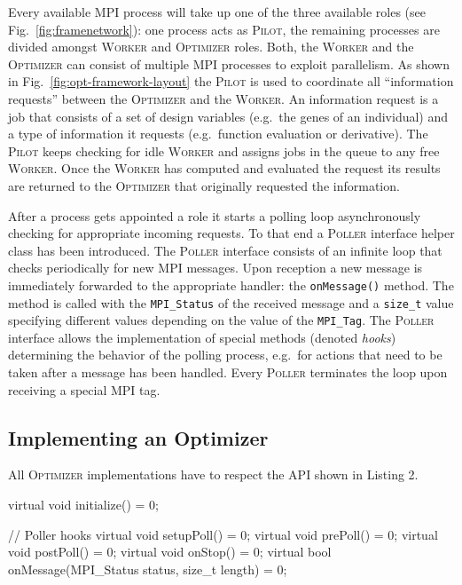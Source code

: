 \documentclass[preprint,linenumbers,amsmath,amssymb,aps,prstab]{revtex4-1}%
\begin{document}
Every available MPI process will take up one of the three available roles (see
  Fig.~\ref{fig:framenetwork}):  one process acts as \textsc{Pilot}, the
  remaining processes are divided amongst \textsc{Worker} and
  \textsc{Optimizer} roles.
Both, the \textsc{Worker} and the \textsc{Optimizer} can consist of multiple
  MPI processes to exploit parallelism.
As shown in Fig.~\ref{fig:opt-framework-layout} the \textsc{Pilot} is used
  to coordinate all ``information requests'' between the \textsc{Optimizer}
  and the \textsc{Worker}.
An information request is a job that consists of a set of design variables
  (e.g.~the genes of an individual) and a type of information it requests
  (e.g.~function evaluation or derivative).
The \textsc{Pilot} keeps checking for idle \textsc{Worker} and assigns jobs
  in the queue to any free \textsc{Worker}.
Once the \textsc{Worker} has computed and evaluated the request its results
  are returned to the \textsc{Optimizer} that originally requested the
  information.

After a process gets appointed a role it starts a polling loop asynchronously
  checking for appropriate incoming requests.
To that end a \textsc{Poller} interface helper class has been introduced.
The \textsc{Poller} interface consists of an infinite loop that checks
  periodically for new MPI messages.
Upon reception a new message is immediately forwarded to the appropriate
  handler: the \texttt{onMessage()} method.
The method is called with the \texttt{MPI\_Status} of the received message and
  a \texttt{size\_t} value specifying different values depending on the value
  of the \texttt{MPI\_Tag}.
The \textsc{Poller} interface allows the implementation of special methods
  (denoted \textit{hooks}) determining the behavior of the polling process,
  e.g.\ for actions that need to be taken after a message has been handled.
Every \textsc{Poller} terminates the loop upon receiving a special MPI tag.


\subsection{Implementing an Optimizer}

All \textsc{Optimizer} implementations have to respect the API shown in
Listing 2.

\begin{code}
virtual void initialize() = 0;

// Poller hooks
virtual void setupPoll() = 0;
virtual void prePoll() = 0;
virtual void postPoll() = 0;
virtual void onStop() = 0;
virtual bool onMessage(MPI_Status status,
                       size_t length) = 0;
\end{code}
\end{document}

